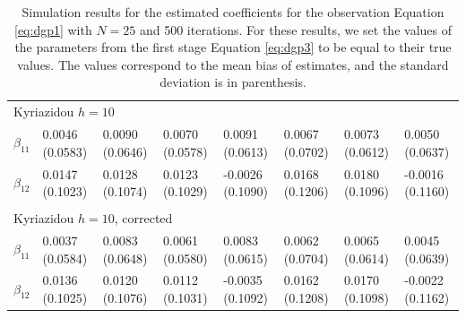 \begin{table}
\begin{adjustwidth}{-.5in}{-.5in}
\begin{tabular}{p{3cm}p{1.3cm}p{1.3cm}p{1.3cm}p{1.3cm}p{1.3cm}p{1.3cm}p{1.3cm}}
                     & & & & & & & \\
        \hline
        \multicolumn{8}{l}{Kyriazidou $h=10$} \\
       \hline
        $\beta_{11}$  & 0.0046 (0.0583) & 0.0090 (0.0646) & 0.0070 (0.0578) & 0.0091 (0.0613) & 0.0067 (0.0702) &  0.0073 (0.0612) & 0.0050 (0.0637) \\
        $\beta_{12}$  & 0.0147 (0.1023) & 0.0128 (0.1074) & 0.0123 (0.1029) & -0.0026 (0.1090) & 0.0168 (0.1206) & 0.0180 (0.1096) & -0.0016 (0.1160)\\
        & & & & & & & \\
        \hline
        \multicolumn{8}{l}{Kyriazidou $h=10$, corrected} \\
       \hline
        $\beta_{11}$  & 0.0037 (0.0584) & 0.0083 (0.0648) & 0.0061 (0.0580) & 0.0083 (0.0615) & 0.0062 (0.0704) &  0.0065 (0.0614) & 0.0045 (0.0639)\\
        $\beta_{12}$  & 0.0136 (0.1025) & 0.0120 (0.1076) & 0.0112 (0.1031) & -0.0035 (0.1092) & 0.0162 (0.1208) & 0.0170 (0.1098) & -0.0022 (0.1162) \\
        \hline
    \end{tabular}
    \caption{\footnotesize{Simulation results for the estimated coefficients for the observation Equation \ref{eq:dgp1} with $N=25$ and 500 iterations. For these results, we set the values of the parameters from the first stage Equation \ref{eq:dgp3} to be equal to their true values. The values correspond to the mean bias of estimates, and the standard deviation is in parenthesis.}}
    \label{tab:5}
    \end{adjustwidth}
\end{table}
